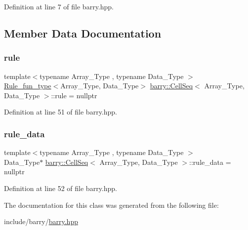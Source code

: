 Definition at line 7 of file barry.\+hpp.



\subsection{Member Data Documentation}
\mbox{\label{classbarry_1_1_cell_seq_a57dfbe0d6e42b3828cb8d0ba8ddc8640}} 
\subsubsection{\texorpdfstring{rule}{rule}}
{\footnotesize\ttfamily template$<$typename Array\+\_\+\+Type , typename Data\+\_\+\+Type $>$ \\
\hyperlink{namespacebarry_aefd7e6d4ba228e2ce1074d075c512178}{Rule\+\_\+fun\+\_\+type}$<$Array\+\_\+\+Type, Data\+\_\+\+Type$>$ \hyperlink{classbarry_1_1_cell_seq}{barry\+::\+Cell\+Seq}$<$ Array\+\_\+\+Type, Data\+\_\+\+Type $>$\+::rule = nullptr\hspace{0.3cm}{\ttfamily [protected]}}



Definition at line 51 of file barry.\+hpp.

\mbox{\label{classbarry_1_1_cell_seq_ad8d6cd5a38746d02d98f4fc8b7624863}} 
\subsubsection{\texorpdfstring{rule\+\_\+data}{rule\_data}}
{\footnotesize\ttfamily template$<$typename Array\+\_\+\+Type , typename Data\+\_\+\+Type $>$ \\
Data\+\_\+\+Type$\ast$ \hyperlink{classbarry_1_1_cell_seq}{barry\+::\+Cell\+Seq}$<$ Array\+\_\+\+Type, Data\+\_\+\+Type $>$\+::rule\+\_\+data = nullptr\hspace{0.3cm}{\ttfamily [protected]}}



Definition at line 52 of file barry.\+hpp.



The documentation for this class was generated from the following file\+:\begin{DoxyCompactItemize}
\item 
include/barry/\hyperlink{barry_8hpp}{barry.\+hpp}\end{DoxyCompactItemize}
